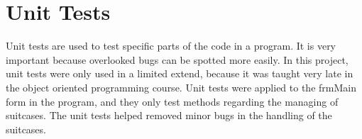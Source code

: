 

\section{Unit Tests}
\label{sec:unittests}
Unit tests are used to test specific parts of the code in a program. It is very important because overlooked bugs can be spotted more easily. In this project, unit tests were only used in a limited extend, because it was taught very late in the object oriented programming course. Unit tests were applied to the frmMain form in the program, and they only test methods regarding the managing of suitcases. The unit tests helped removed minor bugs in the handling of the suitcases. 
